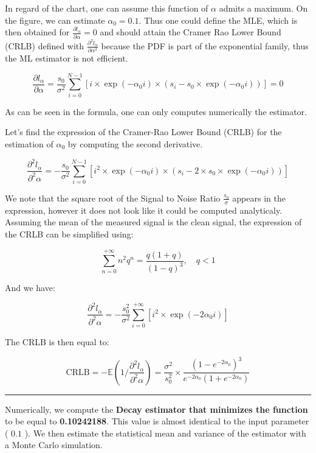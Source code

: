 In regard of the chart, one can assume this function of \(\alpha\) admits a maximum. On the
figure, we can estimate \(\alpha_0 = 0.1\). Thus one could define the MLE, which is then obtained for \(\frac{\partial l_{\alpha}}{\partial \alpha} = 0\) and should attain the Cramer Rao Lower Bound (CRLB) defined with \(\frac{\partial^2 l_{\alpha}}{\partial \alpha^2}\) because the PDF is part of the exponential family, thus the ML estimator is not efficient.

\[
\frac{\partial l_{\alpha}}{\partial \alpha} = \frac{s_0}{\sigma^2} \sum_{i=0}^{N-1} \left[i \times \exp(-\alpha_0 i) \times \left(s_i - s_0 \times \exp(-\alpha_0 i)\right)\right] = 0
\]

As can be seen in the formula, one can only computes numerically the estimator.

Let's find the expression of the Cramer-Rao Lower Bound (CRLB) for the estimation of \(\alpha_{0}\) by computing the second derivative.

\[
\frac{\partial^2 l_{\alpha}}{\partial^2 \alpha} = - \frac{s_0}{\sigma^2} \sum_{i=0}^{N-1} \left[i^2 \times \exp(-\alpha_0 i) \times \left(s_i - 2 \times s_0 \times \exp(-\alpha_0 i)\right)\right]
\]

We note that the square root of the Signal to Noise Ratio \(\frac{s_{0}}{\sigma}\) appears in the expression, however it does not look like it could be computed analyticaly. Assuming the mean of the measured signal is the clean signal, the expression of the CRLB can be simplified using:

\[
\sum_{n=0}^{+\infty} n^{2} q^{n} = \frac{q(1+q)}{(1-q)^{3}}, \quad q < 1
\]

And we have:

\[
\frac{\partial^2 l_{\alpha}}{\partial^2 \alpha} = -\frac{s_0^2}{\sigma^2} \sum_{i=0}^{+\infty} \left[i^2 \times \exp(-2\alpha_0 i)\right]
\]

The CRLB is then equal to:

\[
\text{CRLB} = -\mathbb{E}\left(1 / \frac{\partial^2 l_{\alpha}}{\partial^2 \alpha}\right) = \frac{\sigma^2}{s_0^2} \times \frac{(1-e^{-2\alpha_0})^3}{e^{-2\alpha_0}(1+e^{-2\alpha_0})}
\]

\begin{center}\rule{0.5\linewidth}{0.5pt}\end{center}

Numerically, we compute the \textbf{Decay estimator that minimizes the function} to be equal to \textbf{0.10242188}. This value is almost identical to the input parameter ( \( 0.1 \) ). We then estimate the statistical mean and variance of the estimator with a Monte Carlo simulation.

